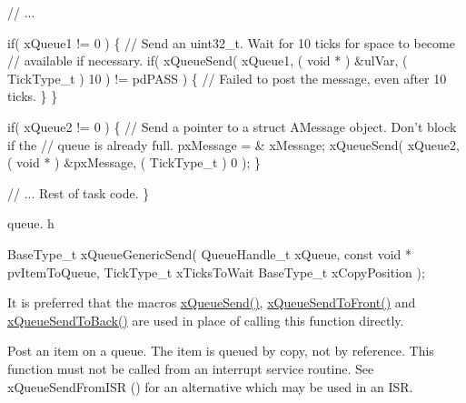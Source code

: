 \begin{DoxyPre}   // ...\end{DoxyPre}



\begin{DoxyPre}   if( xQueue1 != 0 )
   \{
    // Send an uint32\_t.  Wait for 10 ticks for space to become
    // available if necessary.
    if( xQueueSend( xQueue1, ( void * ) \&ulVar, ( TickType\_t ) 10 ) != pdPASS )
    \{
        // Failed to post the message, even after 10 ticks.
    \}
   \}\end{DoxyPre}



\begin{DoxyPre}   if( xQueue2 != 0 )
   \{
    // Send a pointer to a struct AMessage object.  Don't block if the
    // queue is already full.
    pxMessage = \& xMessage;
    xQueueSend( xQueue2, ( void * ) \&pxMessage, ( TickType\_t ) 0 );
   \}\end{DoxyPre}



\begin{DoxyPre}   // ... Rest of task code.
\}
\end{DoxyPre}


queue. h 
\begin{DoxyPre}
BaseType\_t xQueueGenericSend(
                                QueueHandle\_t xQueue,
                                const void * pvItemToQueue,
                                TickType\_t xTicksToWait
                                BaseType\_t xCopyPosition
                            );
  \end{DoxyPre}


It is preferred that the macros \hyperlink{queue_8h_af7eb49d3249351176992950d9185abe9}{x\+Queue\+Send()}, \hyperlink{queue_8h_aa612fcc2b1ceee0200f34b942e300b41}{x\+Queue\+Send\+To\+Front()} and \hyperlink{queue_8h_a81d24a2c1199d58efb76fbee15853112}{x\+Queue\+Send\+To\+Back()} are used in place of calling this function directly.

Post an item on a queue. The item is queued by copy, not by reference. This function must not be called from an interrupt service routine. See x\+Queue\+Send\+From\+I\+SR () for an alternative which may be used in an I\+SR.



